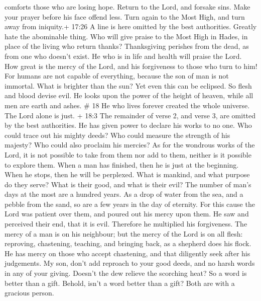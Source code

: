 comforts those who are losing hope.  Return to the Lord,
and forsake sins. Make your prayer before his face offend less.
 Turn again to the Most High, and turn away from iniquity.+
17:26 A line is here omitted by the best authorities. Greatly hate the
abominable thing.  Who will give praise to the Most High in
Hades, in place of the living who return thanks? 
Thanksgiving perishes from the dead, as from one who doesn't exist. He
who is in life and health will praise the Lord.  How great
is the mercy of the Lord, and his forgiveness to those who turn to him!
 For humans are not capable of everything, because the son
of man is not immortal.  What is brighter than the sun? Yet
even this can be eclipsed. So flesh and blood devise evil. 
He looks upon the power of the height of heaven, while all men are earth
and ashes. \# 18  He who lives forever created the whole
universe.  The Lord alone is just.  + 18:3 The
remainder of verse 2, and verse 3, are omitted by the best authorities.
 He has given power to declare his works to no one. Who
could trace out his mighty deeds?  Who could measure the
strength of his majesty? Who could also proclaim his mercies?
 As for the wondrous works of the Lord, it is not possible
to take from them nor add to them, neither is it possible to explore
them.  When a man has finished, then he is just at the
beginning. When he stops, then he will be perplexed.  What
is mankind, and what purpose do they serve? What is their good, and what
is their evil?  The number of man's days at the most are a
hundred years.  As a drop of water from the sea, and a
pebble from the sand, so are a few years in the day of eternity.
 For this cause the Lord was patient over them, and poured
out his mercy upon them.  He saw and perceived their end,
that it is evil. Therefore he multiplied his forgiveness. 
The mercy of a man is on his neighbour; but the mercy of the Lord is on
all flesh: reproving, chastening, teaching, and bringing back, as a
shepherd does his flock.  He has mercy on those who accept
chastening, and that diligently seek after his judgements. 
My son, don't add reproach to your good deeds, and no harsh words in any
of your giving.  Doesn't the dew relieve the scorching
heat? So a word is better than a gift.  Behold, isn't a
word better than a gift? Both are with a gracious person. 
